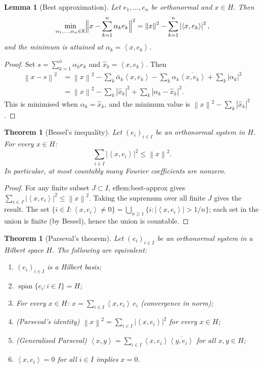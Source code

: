 \documentclass[a4paper,12pt]{book}
\DeclareMathOperator{\spn}{span}
\newcommand{\K}{\mathbb{K}}
\newcommand{\norm}[1]{\left\| #1 \right\|}
\newcommand{\abs}[1]{\left| #1 \right|}
\newcommand{\inner}[2]{\left\langle #1, #2 \right\rangle}
\theoremstyle{definition}
\theoremstyle{plain}
\newtheorem{theorem}[definition]{Theorem}
\newtheorem{lemma}[definition]{Lemma}
\theoremstyle{remark}
\begin{document}
\begin{lemma}[Best approximation]
\label{lem:best-approx}
Let $e_1,\dots,e_n$ be orthonormal and $x\in H$.  Then
\[
  \min_{\alpha_1,\dots,\alpha_n\in\K}
  \Bigl\|x - \sum_{k=1}^n\alpha_k e_k\Bigr\|^2
  = \norm{x}^2 - \sum_{k=1}^n\abs{\inner{x}{e_k}}^2,
\]
and the minimum is attained at $\alpha_k=\inner{x}{e_k}$.
\end{lemma}

\begin{proof}
Set $s=\sum_{k=1}^n\alpha_k e_k$ and $\hat x_k=\inner{x}{e_k}$.  Then
\begin{align*}
  \norm{x-s}^2
  &= \norm{x}^2 - \sum_k\bar\alpha_k\inner{x}{e_k}
     - \sum_k\alpha_k\overline{\inner{x}{e_k}}
     + \sum_k\abs{\alpha_k}^2 \\
  &= \norm{x}^2 - \sum_k\abs{\hat x_k}^2
     + \sum_k\abs{\alpha_k-\hat x_k}^2.
\end{align*}
This is minimised when $\alpha_k=\hat x_k$, and the minimum value is
$\norm{x}^2-\sum_k\abs{\hat x_k}^2$.
\end{proof}

\begin{theorem}[Bessel's inequality]
\label{thm:bessel}
Let $(e_i)_{i\in I}$ be an orthonormal system in $H$.  For every $x\in H$:
\[
  \sum_{i\in I}\abs{\inner{x}{e_i}}^2 \le \norm{x}^2.
\]
In particular, at most countably many Fourier coefficients are nonzero.
\end{theorem}

\begin{proof}
For any finite subset $J\subset I$, 
ef{lem:best-approx} gives
$\sum_{i\in J}\abs{\inner{x}{e_i}}^2\le\norm{x}^2$.  Taking the
supremum over all finite $J$ gives the result.  The set
$\{i\in I:\inner{x}{e_i}\ne 0\}=\bigcup_{n\ge 1}\{i:\abs{\inner{x}{e_i}}>1/n\}$;
each set in the union is finite (by Bessel), hence the union is countable.
\end{proof}

\begin{theorem}[{Parseval's theorem}]
\label{thm:parseval}
Let $(e_i)_{i\in I}$ be an orthonormal system in a Hilbert space $H$.
The following are equivalent:
\begin{enumerate}[label=\textup{(\roman*)}]
  \item $(e_i)_{i\in I}$ is a Hilbert basis;
  \item $\overline{\spn}\{e_i:i\in I\}=H$;
  \item For every $x\in H$:
    $x = \sum_{i\in I}\inner{x}{e_i}\,e_i$\quad
    (convergence in norm);
  \item \textup{(Parseval's identity)}
    $\norm{x}^2 = \sum_{i\in I}\abs{\inner{x}{e_i}}^2$
    for every $x\in H$;
  \item \textup{(Generalised Parseval)}
    $\inner{x}{y}=\sum_{i\in I}\inner{x}{e_i}\overline{\inner{y}{e_i}}$
    for all $x,y\in H$;
  \item $\inner{x}{e_i}=0$ for all $i\in I$ implies $x=0$.
\end{enumerate}
\end{theorem}
\end{document}
